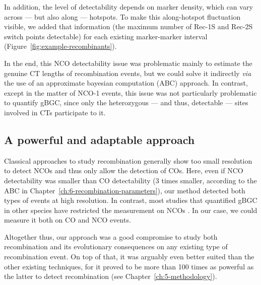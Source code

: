 In addition, the level of detectability depends on marker density, which can vary across — but also along — hotspots.
To make this along-hotspot fluctuation visible, we added that information (the maximum number of Rec-1S and Rec-2S switch points detectable) for each existing marker-marker interval (Figure~\ref{fig:example-recombinants}).

In the end, this NCO detectability issue was problematic mainly to estimate the genuine CT lengths of recombination events, but we could solve it indirectly \textit{via} the use of an approximate bayesian computation (ABC) approach.
In contrast, except in the matter of NCO-1 events, this issue was not particularly problematic to quantify gBGC, since only the heterozygous — and thus, detectable — sites involved in CTs participate to it.






\subsection{A powerful and adaptable approach}

Classical approaches to study recombination generally show too small resolution to detect NCOs and thus only allow the detection of COs.
Here, even if NCO detectability was smaller than CO detectability (3 times smaller, according to the ABC in Chapter~\ref{ch:6-recombination-parameters}), our method detected both types of events at high resolution.
In contrast, most studies that quantified gBGC in other species have restricted the measurement on NCOs \citep{si2015widely,williams2015noncrossover,halldorsson2016rate,smeds2016highresolution}.
In our case, we could measure it both on CO and NCO events. 

Altogether thus, our approach was a good compromise to study both recombination and its evolutionary consequences on any existing type of recombination event.
On top of that, it was arguably even better suited than the other existing techniques, for it proved to be more than 100 times as powerful as the latter to detect recombination (see Chapter~\ref{ch:5-methodology}).\\

